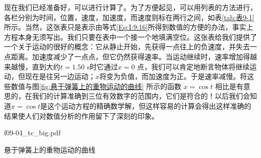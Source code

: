 \documentclass[12pt,oneside]{book}
\begin{document}
现在我们已经准备好，可以进行计算了。为了方便起见，可以用列表的方法进行，各栏分别为时间，位置，速度，加速度，而速度则标在两行之间，如表\ref{tab:表9-1}所示。当然，这张表只是表示由等式\eqref{Eq:I:9:16}所得到数值的方便的办法，事实上方程本身无须写出。我们只要在表中一个接一个地填满空位。这张表给我们提供了一个关于运动的很好的概念：它从静止开始，先获得一点往上的负速度，并失去一点距离。加速度减少了一点点，但它仍然获得速率。当运动继续时，速率增加得越来越慢，直到大约$ t=1.50 $ s时它通过$ x=0 $ 点，我们可以肯定地断言物体将继续运动，但现在是往另一边运动；$ x $将变为负值，而加速度为正。于是速率减慢。将这些数值与图\ref{fig:悬于弹簧上的重物运动的曲线} 所示的函数 $ x=\cos t $ 相比是有意思的，在我们的计算准确到三位有效数字的范围内，它们是符合的！以后我们会知道$ x=\cos t $是这个运动方程的精确数学解，但这样容易的计算会得出这样准确的结果使人们对数值分析的作用留下了深刻的印象。

\begin{fig}{f09-04_tc_big.pdf}
\caption{悬于弹簧上的重物运动的曲线}
\label{fig:悬于弹簧上的重物运动的曲线}
\end{fig}
\end{document}
